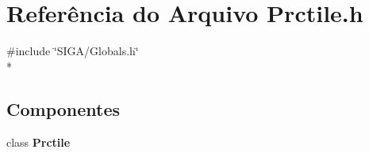 \section{Referência do Arquivo Prctile.\+h}
\label{_prctile_8h}
{\ttfamily \#include \char`\"{}S\+I\+G\+A/\+Globals.\+h\char`\"{}}\\*
\subsection*{Componentes}
\begin{DoxyCompactItemize}
\item 
class {\bf Prctile}
\end{DoxyCompactItemize}

